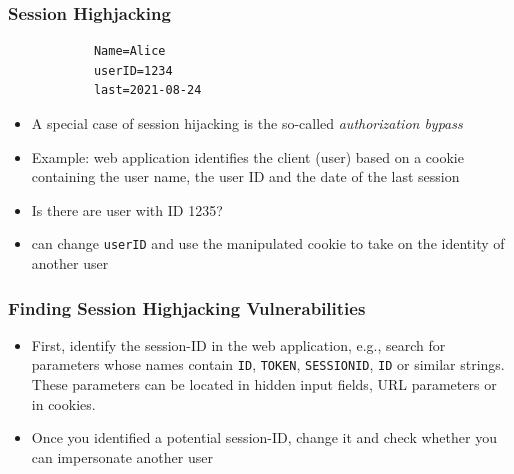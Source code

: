 \begin{frame}[fragile]
    \frametitle{Session Highjacking}

    \begin{center}
        \begin{verbatim}
            Name=Alice
            userID=1234
            last=2021-08-24
        \end{verbatim}
    \end{center}

    \begin{itemize}
        \item A special case of session hijacking is the so-called \emph{authorization bypass}
        \item Example: web application identifies the client (user) based on a cookie containing the user name, the user ID and the date of the last session
        \item Is there are user with ID 1235?
        \item \Attacker can change \verb|userID| and use the manipulated cookie to take on the identity of another user
    \end{itemize}
\end{frame}

\begin{frame}
    \frametitle{Finding Session Highjacking Vulnerabilities}
    \begin{itemize}
        \item First, identify the session-ID in the web application, e.g., search for parameters whose names contain \texttt{ID}, \texttt{TOKEN}, \texttt{SESSIONID}, \texttt{ID} or similar strings. These parameters can be located in hidden input fields, URL parameters or in cookies.
        \item Once you identified a potential session-ID, change it and check whether you can impersonate another user
    \end{itemize}
\end{frame}

